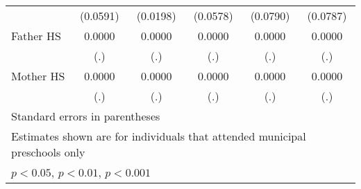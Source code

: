\begin{table}[htbp]
\begin{tabular}{l*{5}{c}}
            &    (0.0591)         &    (0.0198)         &    (0.0578)         &    (0.0790)         &    (0.0787)         \\
\addlinespace
Father HS   &      0.0000         &      0.0000         &      0.0000         &      0.0000         &      0.0000         \\
            &         (.)         &         (.)         &         (.)         &         (.)         &         (.)         \\
\addlinespace
Mother HS   &      0.0000         &      0.0000         &      0.0000         &      0.0000         &      0.0000         \\
            &         (.)         &         (.)         &         (.)         &         (.)         &         (.)         \\
\bottomrule
\multicolumn{6}{l}{\footnotesize Standard errors in parentheses}\\
\multicolumn{6}{l}{\footnotesize Estimates shown are for individuals that attended municipal preschools only}\\
\multicolumn{6}{l}{\footnotesize \sym{*} \(p<0.05\), \sym{**} \(p<0.01\), \sym{***} \(p<0.001\)}\\
\end{tabular}
\end{table}
